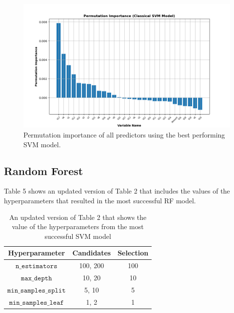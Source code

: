 \documentclass[11pt, oneside]{article}   	%
\begin{document}
\begin{figure}[h!]
	\centering
	\includegraphics[width=1\textwidth]{figures/fig_9.png}
	\captionsetup{font=small} 
	\caption{Permutation importance of all predictors using the best performing SVM model.}
	\label{fig9}
\end{figure}




\subsection{Random Forest}

Table 5 shows an updated version of Table 2 that includes the values of the hyperparameters that resulted in the most successful RF model.

\begin{table}[h!]
    \centering
    \begin{tabular}{|c|c|c|}
        \hline
        \textbf{Hyperparameter} & \textbf{Candidates} & \textbf{Selection}\\ \hline
        $\texttt{n\_estimators}$ &  100, 200 & 100 \\ \hline
        $\texttt{max\_depth}$ & 10, 20 & 10\\ \hline
        $\texttt{min\_samples\_split}$ & 5, 10 & 5\\ \hline
        $\texttt{min\_samples\_leaf}$ & 1, 2 & 1 \\ \hline
    \end{tabular}
    \caption{An updated version of Table 2 that shows the value of the hyperparameters from the most successful SVM model}
    \label{tab5}
\end{table}
\end{document}
